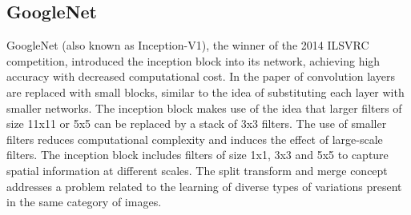 \documentclass[
a4paper, 
12pt,
grayscalebody, %
abstract=on,
twoside, BCOR10mm, 12pt, DIV13,headinclude, footexclude, final, abstracton, openright
]{ibireprt}
\numberwithin{equation}{chapter}
\numberwithin{table}{chapter}
\numberwithin{figure}{chapter}
\numberwithin{algorithm}{chapter}
\numberwithin{example}{chapter}
\numberwithin{example}{chapter}
\begin{document}
\subsection{GoogleNet}
GoogleNet (also known as Inception-V1), the winner of the 2014 ILSVRC competition, introduced the inception block into its network, achieving high accuracy with decreased computational cost. In the paper of \citet{Szegedy2015} convolution layers are replaced with small blocks, similar to the idea of substituting each layer with smaller networks. The inception block makes use of the idea that larger filters of size 11x11 or 5x5 can be replaced by a stack of 3x3 filters. The use of smaller filters reduces computational complexity and induces the effect of large-scale filters. The inception block includes filters of size 1x1, 3x3 and 5x5 to capture spatial information at different scales. The split transform and merge concept addresses a problem related to the learning of diverse types of variations present in the same category of images.%



\end{document}

